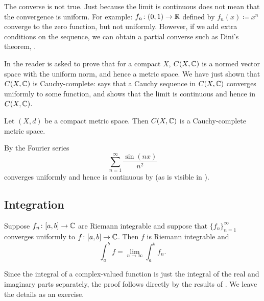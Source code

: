 The converse is not true.  Just because the limit is continuous does not mean
that the convergence is uniform.  For example:
$f_n \colon (0,1) \to {\mathbb{R}}$ defined by $f_n(x) \coloneqq x^n$ converge to
the zero function, but not uniformly.  However, if we add extra conditions
on the sequence, we can obtain a partial converse such as Dini's theorem,
.

In  the reader is asked to prove
that for a compact $X$, $C(X,{\mathbb{C}})$ is a normed vector space
with the uniform norm, and hence a metric space.  We have just shown that
$C(X,{\mathbb{C}})$ is Cauchy-complete:   says that a Cauchy
sequence in $C(X,{\mathbb{C}})$ converges uniformly to some function,
and  shows that the limit is
continuous and hence in $C(X,{\mathbb{C}})$.

\begin{cor}
Let $(X,d)$ be a compact metric space.
Then $C(X,{\mathbb{C}})$ is a Cauchy-complete metric space.
\end{cor}

\begin{example}
By 
the Fourier series 
\begin{equation*}
\sum_{n=1}^\infty \frac{\sin(nx)}{n^2}
\end{equation*}
converges uniformly and hence is continuous by  (as is visible
in ).
\end{example}

\subsection{Integration}

\begin{prop} \label{prop:complexlimitswapintegral}
Suppose $f_n \colon [a,b] \to {\mathbb{C}}$
are Riemann integrable and suppose that $\{ f_n \}_{n=1}^\infty$ converges
uniformly to $f \colon [a,b] \to {\mathbb{C}}$.  Then $f$ is Riemann integrable
and
\begin{equation*}
\int_a^b f = \lim_{n\to \infty} \int_a^b f_n .
\end{equation*}
\end{prop}

Since the integral of a complex-valued function is just the integral of
the real and imaginary parts separately,
the proof follows directly by the results of
.
We leave the details as an exercise.

